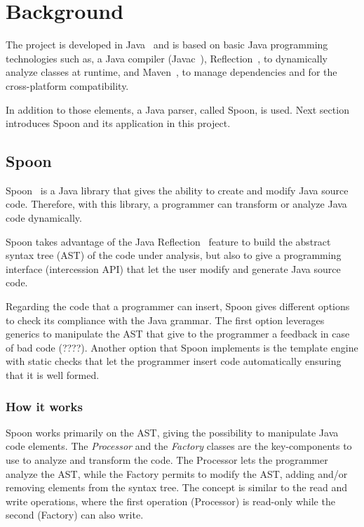 \chapter{Background}\label{ch:background}
The project is developed in Java~\cite{Arnold:2000:JPL:556709} and is based on basic Java programming technologies such as, a Java compiler (Javac~\cite{javacWiki}), Reflection~\cite{reflect}, to dynamically analyze classes at runtime, and Maven~\cite{bharathan2015apache}, to manage dependencies and for the cross-platform compatibility.

In addition to those elements, a Java parser, called Spoon, is used. Next section introduces Spoon and its application in this project.

\section{Spoon}\label{sec:spoon}
Spoon~\cite{pawlak:hal-01169705} is a Java library that gives the ability to create and modify Java source code. Therefore, with this library, a programmer can transform or analyze Java code dynamically.

Spoon takes advantage of the Java Reflection~\cite{reflect} feature to build the abstract syntax tree (AST) of the code under analysis, but also to give a programming interface (intercession API) that let the user modify and generate Java source code.


Regarding the code that a programmer can insert, Spoon gives different options to check its compliance with the Java grammar. The first option leverages generics to manipulate the AST that give to the programmer a feedback in case of bad code (????). Another option that Spoon implements is the template engine with static checks that let the programmer insert code automatically ensuring that it is well formed.


\subsection*{How it works}\label{subsec:howSpoon}
Spoon works primarily on the AST, giving the possibility to manipulate Java code elements. The \emph{Processor} and the \emph{Factory} classes are the key-components to use to analyze and transform the code. The Processor lets the programmer analyze the AST, while the Factory permits to modify the AST, adding and/or removing elements from the syntax tree. The concept is similar to the read and write operations, where the first operation (Processor) is read-only while the second (Factory) can also write.

